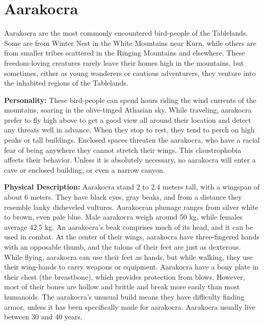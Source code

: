 \section{Aarakocra}

Aarakocra are the most commonly encountered bird-people of the Tablelands. Some are from Winter Nest in the White Mountains near Kurn, while others are from smaller tribes scattered in the Ringing Mountains and elsewhere. These freedom-loving creatures rarely leave their homes high in the mountains, but sometimes, either as young wanderers or cautious adventurers, they venture into the inhabited regions of the Tablelands.


\textbf{Personality:} These bird-people can spend hours riding the wind currents of the mountains, soaring in the olive-tinged Athasian sky. While traveling, aarakocra prefer to fly high above to get a good view all around their location and detect any threats well in advance. When they stop to rest, they tend to perch on high peaks or tall buildings. Enclosed spaces threaten the aarakocra, who have a racial fear of being anywhere they cannot stretch their wings. This claustrophobia affects their behavior. Unless it is absolutely necessary, no aarakocra will enter a cave or enclosed building, or even a narrow canyon.

\textbf{Physical Description:} Aarakocra stand 2 to 2.4 meters tall, with a wingspan of about 6 meters. They have black eyes, gray beaks, and from a distance they resemble lanky disheveled vultures. Aarakocran plumage ranges from silver white to brown, even pale blue. Male aarakocra weigh around 50 kg, while females average 42.5 kg. An aarakocra's beak comprises much of its head, and it can be used in combat. At the center of their wings, aarakocra have three-fingered hands with an opposable thumb, and the talons of their feet are just as dexterous. While flying, aarakocra can use their feet as hands, but while walking, they use their wing-hands to carry weapons or equipment. Aarakocra have a bony plate in their chest (the breastbone), which provides protection from blows. However, most of their bones are hollow and brittle and break more easily than most humanoids. The aarakocra's unusual build means they have difficulty finding armor, unless it has been specifically made for aarakocra. Aarakocra usually live between 30 and 40 years.

